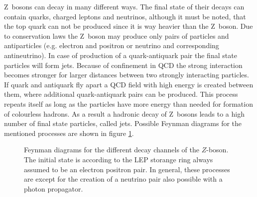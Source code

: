 \documentclass[11pt, a4paper]{article}
\numberwithin{equation}{section}
\begin{document}
Z~bosons can decay in many different ways.
The final state of their decays can contain quarks, charged leptons and neutrinos, although it must be noted, that the top quark can not be produced since it is way heavier than the Z~boson.
Due to conservation laws the Z~boson may produce only pairs of particles and antiparticles (e.g. electron and positron or neutrino and corresponding antineutrino).
In case of production of a quark-antiquark pair the final state particles will form jets.
Because of confinement in QCD the strong interaction becomes stronger for larger distances between two strongly interacting particles.
If quark and antiquark fly apart a QCD field with high energy is created between them, where additional quark-antiquark pairs can be produced.
This process repeats itself as long as the particles have more energy than needed for formation of colourless hadrons.
As a result a hadronic decay of Z~bosons leads to a high number of final state particles, called jets.
Possible Feynman diagrams for the mentioned processes are shown in figure \ref{fig:feynman}.

\begin{figure}[htb]
	\begin{subfigure}{.33\textwidth}
		\centering
	\end{subfigure}
	\begin{subfigure}{.33\textwidth}
		\centering
	\end{subfigure}
	\begin{subfigure}{.33\textwidth}
		\centering
	\end{subfigure}
	\begin{subfigure}{.33\textwidth}
		\centering
	\end{subfigure}
	\begin{subfigure}{.33\textwidth}
		\centering
	\end{subfigure}
	\begin{subfigure}{.33\textwidth}
		\centering
	\end{subfigure}
	\caption{Feynman diagrams for the different decay channels of the $Z$-boson. The initial state is according to the LEP storange ring always assumed to be an electron positron pair. In general, these processes are except for the creation of a neutrino pair also possible with a photon propagator.}
	\label{fig:feynman}
\end{figure}
\end{document}
